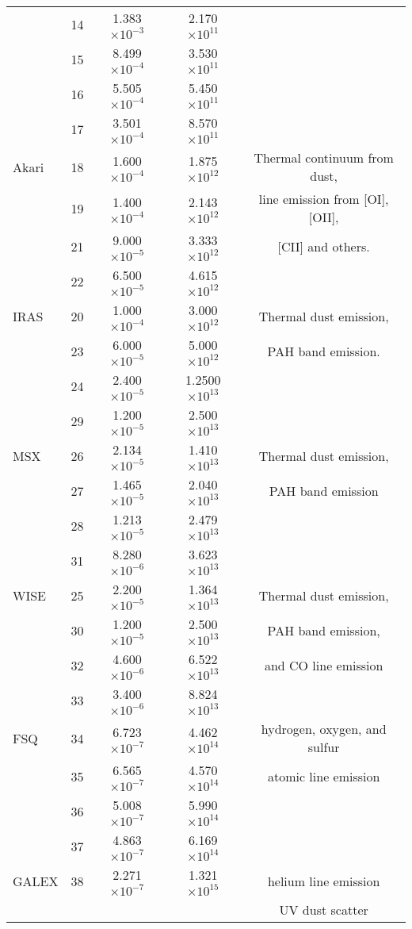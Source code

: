 \begin{table}
\begin{center}
{\begin{tabular}{ l c c c c }
& 14 & 1.383 $\times 10^{-3}$ & 2.170 $\times 10^{11}$ & \\
& 15 & 8.499 $\times 10^{-4}$ & 3.530 $\times 10^{11}$ & \\
& 16 & 5.505 $\times 10^{-4}$ & 5.450 $\times 10^{11}$ & \\
& 17 & 3.501 $\times 10^{-4}$ & 8.570 $\times 10^{11}$ & \\ \hline
Akari  & 18 & 1.600 $\times 10^{-4}$ & 1.875 $\times 10^{12}$ & Thermal continuum from dust,\\ 
& 19 & 1.400 $\times 10^{-4}$ & 2.143 $\times 10^{12}$ & line emission from [OI], [OII], \\
& 21 & 9.000 $\times 10^{-5}$ & 3.333 $\times 10^{12}$ & [CII] and others. \\
& 22 & 6.500 $\times 10^{-5}$ & 4.615 $\times 10^{12}$ & \\ \hline
IRAS & 20 & 1.000 $\times 10^{-4}$ &  3.000 $\times 10^{12}$ &  Thermal dust emission, \\
& 23 & 6.000 $\times 10^{-5}$ & 5.000 $\times 10^{12}$ &  PAH band emission. \\ 
& 24 & 2.400 $\times 10^{-5}$ & 1.2500 $\times 10^{13}$ &  \\
& 29 & 1.200 $\times 10^{-5}$ & 2.500 $\times 10^{13}$ &  \\ \hline
MSX & 26 & 2.134 $\times 10^{-5}$ & 1.410 $\times 10^{13}$ & Thermal dust emission,  \\
& 27 & 1.465 $\times 10^{-5}$ & 2.040 $\times 10^{13}$ &  PAH band emission \\
& 28 & 1.213 $\times 10^{-5}$ & 2.479 $\times 10^{13}$ &   \\ 
& 31 & 8.280 $\times 10^{-6}$ & 3.623 $\times 10^{13}$ &   \\ \hline
WISE & 25 & 2.200 $\times 10^{-5}$ & 1.364 $\times 10^{13}$ & Thermal dust emission,      \\ 
& 30 & 1.200 $\times 10^{-5}$ & 2.500 $\times 10^{13}$ & PAH band emission, \\
& 32 & 4.600 $\times 10^{-6}$ & 6.522 $\times 10^{13}$ &  and CO line emission\\
& 33 & 3.400 $\times 10^{-6}$ &  8.824 $\times 10^{13}$ &  \\ \hline
FSQ & 34 & 6.723 $\times 10^{-7}$ & 4.462 $\times 10^{14}$ & hydrogen, oxygen, and sulfur\\
& 35 & 6.565 $\times 10^{-7}$ & 4.570 $\times 10^{14}$ & atomic line emission \\
& 36 & 5.008 $\times 10^{-7}$ & 5.990 $\times 10^{14}$ &  \\
& 37 & 4.863 $\times 10^{-7}$ & 6.169 $\times 10^{14}$ &  \\ \hline
GALEX & 38 & 2.271 $\times 10^{-7}$ & 1.321 $\times 10^{15}$ & helium line emission \\
 & & & & UV dust scatter           \\ 
\hline
\end{tabular}
}
\end{center}
\end{table}

